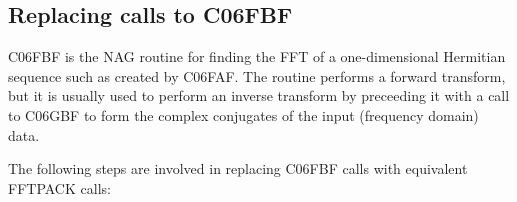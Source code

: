 \documentclass[11pt,twoside]{article}
\newcommand{\xlabel}[1]{}
\begin{document}

\subsection{\xlabel{replacing_calls_to_c06fbf}Replacing calls to C06FBF}

   C06FBF is the NAG routine for finding the FFT of a one-dimensional
   Hermitian sequence such as created by C06FAF. The routine performs a
   forward transform, but it is usually used to perform an inverse
   transform by preceeding it with a call to C06GBF to form the complex
   conjugates of the input (frequency domain) data.

   The following steps are involved in replacing C06FBF calls with
   equivalent FFTPACK calls:
\end{document}
